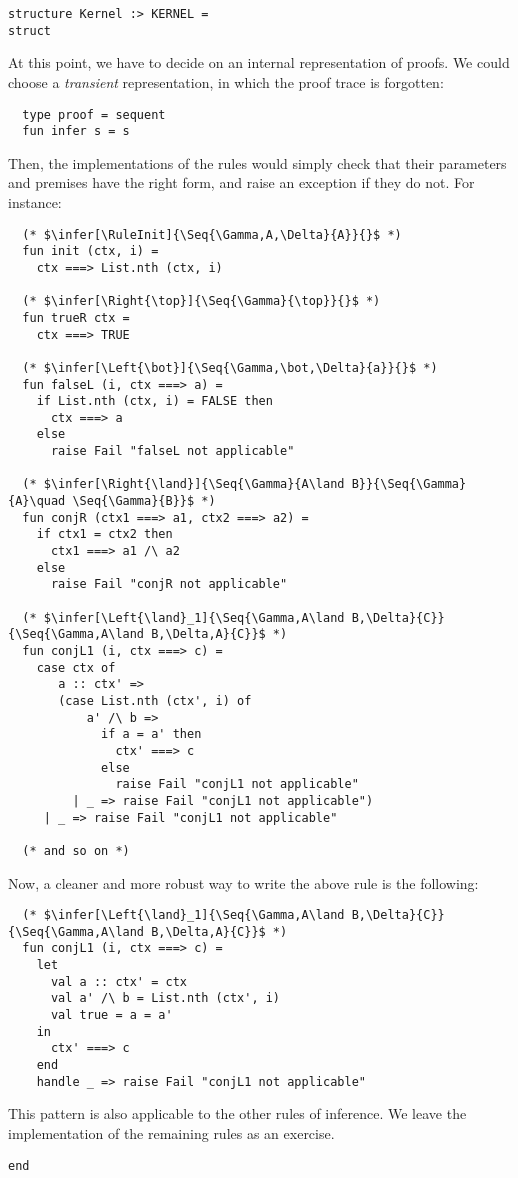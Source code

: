 \documentclass{article}
\newcommand\Seq[2]{{#1}\Longrightarrow{#2}}
\newcommand\Right[1]{{#1}\mathsf{R}}
\newcommand\Left[1]{{#1}\mathsf{L}}
\newcommand\RuleInit{\mathsf{init}}
\theoremstyle{definition}
\theoremstyle{remark}
\begin{document}
\begin{verbatim}
structure Kernel :> KERNEL =
struct
\end{verbatim}
At this point, we have to decide on an internal representation of
proofs. We could choose a \emph{transient} representation, in which
the proof trace is forgotten:
\begin{verbatim}
  type proof = sequent
  fun infer s = s
\end{verbatim}
Then, the implementations of the rules would simply check that their
parameters and premises have the right form, and raise an exception if
they do not. For instance:
\begin{verbatim}
  (* $\infer[\RuleInit]{\Seq{\Gamma,A,\Delta}{A}}{}$ *)
  fun init (ctx, i) =
    ctx ===> List.nth (ctx, i)

  (* $\infer[\Right{\top}]{\Seq{\Gamma}{\top}}{}$ *)
  fun trueR ctx =
    ctx ===> TRUE

  (* $\infer[\Left{\bot}]{\Seq{\Gamma,\bot,\Delta}{a}}{}$ *)
  fun falseL (i, ctx ===> a) =
    if List.nth (ctx, i) = FALSE then
      ctx ===> a
    else
      raise Fail "falseL not applicable"

  (* $\infer[\Right{\land}]{\Seq{\Gamma}{A\land B}}{\Seq{\Gamma}{A}\quad \Seq{\Gamma}{B}}$ *)
  fun conjR (ctx1 ===> a1, ctx2 ===> a2) =
    if ctx1 = ctx2 then
      ctx1 ===> a1 /\ a2
    else
      raise Fail "conjR not applicable"

  (* $\infer[\Left{\land}_1]{\Seq{\Gamma,A\land B,\Delta}{C}}{\Seq{\Gamma,A\land B,\Delta,A}{C}}$ *)
  fun conjL1 (i, ctx ===> c) =
    case ctx of
       a :: ctx' =>
       (case List.nth (ctx', i) of
           a' /\ b =>
             if a = a' then
               ctx' ===> c
             else
               raise Fail "conjL1 not applicable"
         | _ => raise Fail "conjL1 not applicable")
     | _ => raise Fail "conjL1 not applicable"

  (* and so on *)
\end{verbatim}
Now, a cleaner and more robust way to write the above rule is the
following:
\begin{verbatim}
  (* $\infer[\Left{\land}_1]{\Seq{\Gamma,A\land B,\Delta}{C}}{\Seq{\Gamma,A\land B,\Delta,A}{C}}$ *)
  fun conjL1 (i, ctx ===> c) =
    let
      val a :: ctx' = ctx
      val a' /\ b = List.nth (ctx', i)
      val true = a = a'
    in
      ctx' ===> c
    end
    handle _ => raise Fail "conjL1 not applicable"
\end{verbatim}
This pattern is also applicable to the other rules of inference. We
leave the implementation of the remaining rules as an exercise.
\begin{verbatim}
end
\end{verbatim}
\end{document}
